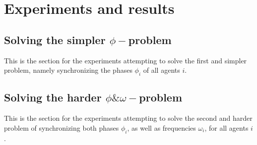 \chapter{Experiments and results}
	
	\section{Solving the simpler $\phi-$problem}
	This is the section for the experiments attempting to solve the first and simpler problem, namely synchronizing the phases $\phi_i$ of all agents $i$. \nl
	
	
	
	
	\section{Solving the harder $\phi\&\omega-$problem}
	
	This is the section for the experiments attempting to solve the second and harder problem of synchronizing both phases $\phi_i$, as well as frequencies $\omega_i$, for all agents $i$.